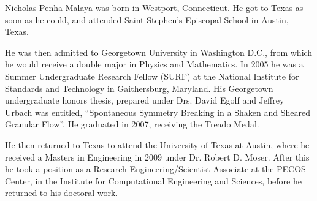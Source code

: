
Nicholas Penha Malaya was born in Westport, Connecticut. He got to Texas
as soon as he could, and attended Saint Stephen's Episcopal School in
Austin, Texas. 

He was then admitted to Georgetown University in Washington D.C., from
which he would receive a double major in Physics and Mathematics. In
2005 he was a Summer Undergraduate Research Fellow (SURF) at the
National Institute for Standards and Technology in Gaithersburg,
Maryland. His Georgetown undergraduate honors thesis, prepared under
Drs\@. David Egolf and Jeffrey Urbach was entitled, ``Spontaneous
Symmetry Breaking in a Shaken and Sheared Granular Flow''. He graduated
in 2007, receiving the Treado Medal.   

He then returned to Texas to attend the University of Texas at
Austin, where he received a Masters in Engineering in 2009 under
Dr\@. Robert D. Moser. After this he took a position as a Research
Engineering/Scientist Associate at the PECOS Center, in the Institute
for Computational Engineering and Sciences, before he returned to his
doctoral work. 

